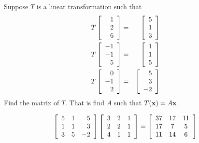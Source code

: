 \begin{enumialphparenastyle}
\begin{ex} Suppose $T$ is a linear transformation such that 
\begin{eqnarray*}
T\left[
\begin{array}{r}
1 \\
2 \\
-6
\end{array}
\right] &=&\left[
\begin{array}{r}
5 \\
1 \\
3
\end{array}
\right] \\
T\left[
\begin{array}{r}
-1 \\
-1 \\
5
\end{array}
\right] &=&\left[
\begin{array}{r}
1 \\
1 \\
5
\end{array}
\right] \\
T\left[
\begin{array}{r}
0 \\
-1 \\
2
\end{array}
\right] &=&\left[
\begin{array}{r}
5 \\
3 \\
-2
\end{array}
\right]
\end{eqnarray*}
Find the matrix of $T$. That is find $A$ such that $T({\bf x})=A{\bf x}$. \vspace{1mm}
\begin{sol}
\[
\left[
\begin{array}{rrr}
5 & 1 & 5 \\
1 & 1 & 3 \\
3 & 5 & -2
\end{array}
\right] \left[
\begin{array}{ccc}
3 & 2 & 1 \\
2 & 2 & 1 \\
4 & 1 & 1
\end{array}
\right] =\left[
\begin{array}{ccc}
37 & 17 & 11 \\
17 & 7 & 5 \\
11 & 14 & 6
\end{array}
\right]
\]
\end{sol}
\end{ex}


\end{enumialphparenastyle}
